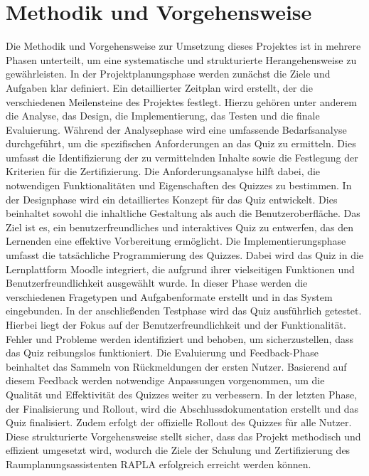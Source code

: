 \section{Methodik und Vorgehensweise}
Die Methodik und Vorgehensweise zur Umsetzung dieses Projektes ist in mehrere Phasen unterteilt, um eine systematische und strukturierte Herangehensweise zu gewährleisten.
In der Projektplanungsphase werden zunächst die Ziele und Aufgaben klar definiert. Ein detaillierter Zeitplan wird erstellt, der die verschiedenen Meilensteine des Projektes festlegt. Hierzu gehören unter anderem die Analyse, das Design, die Implementierung, das Testen und die finale Evaluierung.
Während der Analysephase wird eine umfassende Bedarfsanalyse durchgeführt, um die spezifischen Anforderungen an das Quiz zu ermitteln. Dies umfasst die Identifizierung der zu vermittelnden Inhalte sowie die Festlegung der Kriterien für die Zertifizierung. Die Anforderungsanalyse hilft dabei, die notwendigen Funktionalitäten und Eigenschaften des Quizzes zu bestimmen.
In der Designphase wird ein detailliertes Konzept für das Quiz entwickelt. Dies beinhaltet sowohl die inhaltliche Gestaltung als auch die Benutzeroberfläche. Das Ziel ist es, ein benutzerfreundliches und interaktives Quiz zu entwerfen, das den Lernenden eine effektive Vorbereitung ermöglicht.
Die Implementierungsphase umfasst die tatsächliche Programmierung des Quizzes. Dabei wird das Quiz in die Lernplattform Moodle integriert, die aufgrund ihrer vielseitigen Funktionen und Benutzerfreundlichkeit ausgewählt wurde. In dieser Phase werden die verschiedenen Fragetypen und Aufgabenformate erstellt und in das System eingebunden.
In der anschließenden Testphase wird das Quiz ausführlich getestet. Hierbei liegt der Fokus auf der Benutzerfreundlichkeit und der Funktionalität. Fehler und Probleme werden identifiziert und behoben, um sicherzustellen, dass das Quiz reibungslos funktioniert.
Die Evaluierung und Feedback-Phase beinhaltet das Sammeln von Rückmeldungen der ersten Nutzer. Basierend auf diesem Feedback werden notwendige Anpassungen vorgenommen, um die Qualität und Effektivität des Quizzes weiter zu verbessern.
In der letzten Phase, der Finalisierung und Rollout, wird die Abschlussdokumentation erstellt und das Quiz finalisiert. Zudem erfolgt der offizielle Rollout des Quizzes für alle Nutzer.
Diese strukturierte Vorgehensweise stellt sicher, dass das Projekt methodisch und effizient umgesetzt wird, wodurch die Ziele der Schulung und Zertifizierung des Raumplanungsassistenten RAPLA erfolgreich erreicht werden können.


